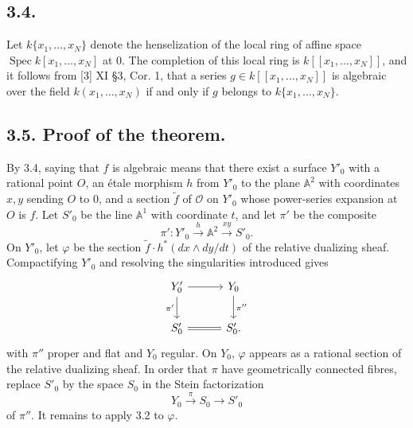 \documentclass[11pt,leqno]{article}
\DeclareMathOperator{\Spec}{Spec}
\newcommand{\OO}{\mathcal O}
\newcommand{\Aaff}{\mathbb A}
\begin{document}
\subsection*{3.4.}
Let $k\{x_1,\ldots,x_N\}$ denote the henselization of the local ring of affine space $\Spec k[x_1,\ldots,x_N]$ at 0. The completion of this local ring is $k[[x_1,\ldots,x_N]]$, and it follows from [3] XI §3, Cor. 1, that a series $g\in k[[x_1,\ldots,x_N]]$ is algebraic over the field $k(x_1,\ldots,x_N)$ if and only if $g$ belongs to $k\{x_1,\ldots,x_N\}$.

\subsection*{3.5. Proof of the theorem.}
By 3.4, saying that $f$ is algebraic means that there exist a surface $Y'_0$ with a rational point $O$, an étale morphism $h$ from $Y'_0$ to the plane $\Aaff^2$ with coordinates $x,y$ sending $O$ to 0, and a section $\widetilde f$ of $\OO$ on $Y'_0$ whose power-series expansion at $O$ is $f$. Let $S'_0$ be the line $\Aaff^1$ with coordinate $t$, and let $\pi'$ be the composite
\[
        \pi':Y'_0\xrightarrow{h}\Aaff^2\xrightarrow{xy}S'_0.
\]
On $Y'_0$, let $\varphi$ be the section $\widetilde f\cdot h^*(dx\wedge dy/dt)$ of the relative dualizing sheaf. Compactifying $Y'_0$ and resolving the singularities introduced gives
\[
\begin{tikzcd}[column sep=3em,row sep=2em]
Y'_0 \arrow[r] \arrow[d,"\pi'"'] & Y_0 \arrow[d,"\pi''"] \\
S'_0 \arrow[r,equal] & S'_0.
\end{tikzcd}
\]
with $\pi''$ proper and flat and $Y_0$ regular. On $Y_0$, $\varphi$ appears as a rational section of the relative dualizing sheaf. In order that $\pi$ have geometrically connected fibres, replace $S'_0$ by the space $S_0$ in the Stein factorization
\[
        Y_0\xrightarrow{\pi}S_0\longrightarrow S'_0
\]
of $\pi''$. It remains to apply 3.2 to $\varphi$.
\end{document}

